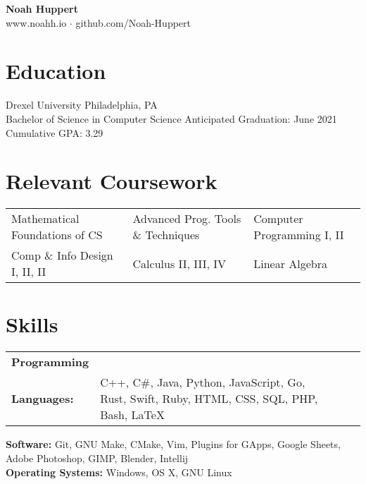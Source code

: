 \documentclass[10pt]{article}
\begin{document}
\centering
	\textbf{Noah Huppert} \\
	
	www.noahh.io $\cdot$ github.com/Noah-Huppert


\begin{flushleft}

\section{Education}
	Drexel University \hfill Philadelphia, PA \\
	Bachelor of Science in Computer Science \hfill Anticipated Graduation: June 2021 \\
	Cumulative GPA: 3.29

\section{Relevant Coursework}
	\begin{tabularx}{\textwidth}{X X X}
		Mathematical Foundations of CS & Advanced Prog. Tools \& Techniques & Computer Programming I, II \\
		Comp \& Info Design I, II, II & Calculus II, III, IV & Linear Algebra \\
	\end{tabularx}

\section{Skills}
	\begin{tabularx}{\textwidth}{@{}ll@{} l X}
	\textbf{Programming} \\
	\textbf{Languages:}

	& 

	\topskip0pt
	\vspace*{\fill}
	C++, C\#, Java, Python, JavaScript, Go, Rust, Swift, Ruby, HTML, CSS, SQL, PHP, Bash, LaTeX
	\vspace*{\fill}

	\end{tabularx}
	\textbf{Software:} Git, GNU Make, CMake, Vim, Plugins for GApps, Google Sheets, Adobe Photoshop, GIMP, Blender, Intellij \\
	\textbf{Operating Systems:} Windows, OS X, GNU Linux


\end{flushleft}
\end{document}
